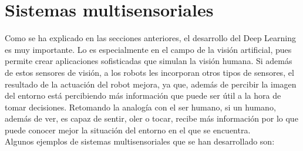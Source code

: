 \section{Sistemas multisensoriales}
Como se ha explicado en las secciones anteriores, el desarrollo del Deep Learning es muy importante. Lo es especialmente en el campo de la visión artificial, pues permite crear aplicaciones sofisticadas que simulan la visión humana. Si además de estos sensores de visión, a los robots les incorporan otros tipos de sensores, el resultado de la actuación del robot mejora, ya que, además de percibir la imagen del entorno está percibiendo más información que puede ser útil a la hora de tomar decisiones. Retomando la analogía con el ser humano, si un humano, además de ver, es capaz de sentir, oler o tocar, recibe más información por lo que puede conocer mejor la situación del entorno en el que se encuentra.\\

Algunos ejemplos de sistemas multisensoriales que se han desarrollado son:


